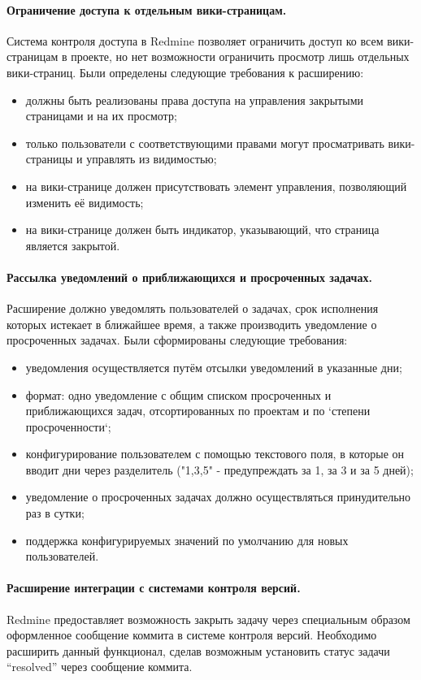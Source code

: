\paragraph{Ограничение доступа к отдельным вики-страницам.}
\label{definition:private_wiki}
Система контроля доступа в Redmine позволяет ограничить доступ ко всем
вики-страницам в проекте, но нет возможности ограничить просмотр лишь отдельных
вики-страниц. Были определены следующие требования к расширению:
\begin{itemize}
  \item должны быть реализованы права доступа на управления закрытыми
  страницами и на их просмотр;
  \item только пользователи с соответствующими правами могут просматривать
  вики-страницы и управлять из видимостью;   
  \item на вики-странице должен присутствовать элемент управления, позволяющий
  изменить её видимость;
  \item на вики-странице должен быть индикатор, указывающий, что страница
  является закрытой.
\end{itemize}

\paragraph{Рассылка уведомлений о приближающихся и просроченных задачах.}
Расширение должно уведомлять пользователей о задачах, срок исполнения которых
истекает в ближайшее время, а также производить уведомление о просроченных
задачах. Были сформированы следующие требования:
\begin{itemize}
  \item уведомления осуществляется путём отсылки уведомлений в указанные дни;
  \item формат: одно уведомление с общим списком просроченных и приближающихся
  задач, отсортированных по проектам и по `степени просроченности`; 
  \item конфигурирование пользователем с помощью текстового поля, в которые он
  вводит дни через разделитель ("1,3,5" - предупреждать за 1, за 3 и за 5
  дней);
  \item уведомление о просроченных задачах должно осуществляться принудительно
  раз в сутки;
  \item поддержка конфигурируемых значений по умолчанию для новых
  пользователей.
\end{itemize}

\paragraph{Расширение интеграции с системами контроля версий.}
Redmine предоставляет возможность закрыть задачу через специальным образом
оформленное сообщение коммита в системе контроля версий. Необходимо расширить
данный функционал, сделав возможным установить статус задачи ``resolved''
через сообщение коммита.


